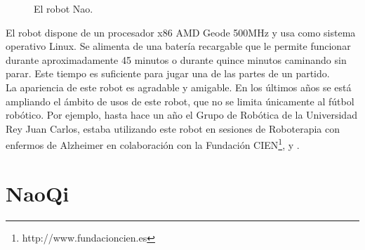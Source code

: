 \begin{figure}[hbtp]
  \centering
  \caption{El robot Nao.}
  \label{fig:robotnao}
\end{figure}

El robot dispone de un procesador x86 AMD Geode 500MHz y usa como sistema operativo Linux. Se alimenta de una batería recargable que le permite funcionar durante aproximadamente 45 minutos o durante quince minutos caminando sin parar. Este tiempo es suficiente para jugar una de las partes de un partido.\\

La apariencia de este robot es agradable y amigable. En los últimos años se está ampliando el ámbito de usos de este robot, que no se limita únicamente al fútbol robótico. Por ejemplo, hasta hace un año el Grupo de Robótica de la Universidad Rey Juan Carlos, estaba utilizando este robot en sesiones de Roboterapia con enfermos de Alzheimer en colaboración con la Fundación CIEN\footnote{http://www.fundacioncien.es}, \cite{Alzheimer2013} y \cite{RobotsEnTerapias2012}.

\section{NaoQi}
\label{sec:naoqi}

